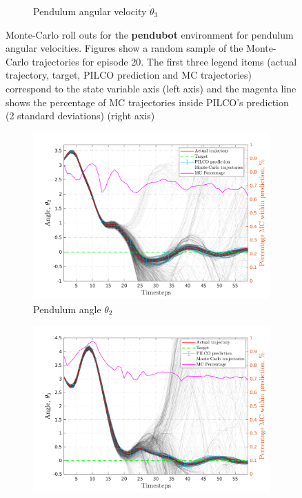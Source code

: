 \begin{figure}[htp!]
\begin{subfigure}[b]{1\linewidth}
    \caption{Pendulum angular velocity $\dot \theta_{3}$} 
    \label{Fig:Re-pen-cart-velocity} 
  \end{subfigure} 
\caption[Monte-Carlo roll outs for \textbf{pendubot} pendulum angular velocities]{Monte-Carlo roll outs for the \textbf{pendubot} environment for pendulum angular velocities. Figures show a random sample of the Monte-Carlo trajectories for episode 20. The first three legend items (actual trajectory, target, PILCO prediction and MC trajectories) correspond to the state variable axis (left axis) and the magenta line shows the percentage of MC trajectories inside PILCO's prediction (2 standard deviations) (right axis)}
\label{Re:pen-MC-roll-outs-1} 
\end{figure}
 
 
\begin{figure}[htp!]    
   \begin{subfigure}[b]{1\linewidth}
    \centering
    \includegraphics[height=0.4\textheight,width=1\textwidth]{Chapter3/Figures/pen_MC_rollout_Ep_40_Dim_3.png} 
    \caption{Pendulum angle $\theta_2$} 
    \label{Fig:Re-pen-pen-velocity} 
  \end{subfigure} 
  \hspace{\fill}
  \begin{subfigure}[b]{1\linewidth}
    \centering
    \includegraphics[height=0.4\textheight,width=1\textwidth]{Chapter3/Figures/pen_MC_rollout_Ep_40_Dim_4.png} 

\end{subfigure}
\end{figure}
